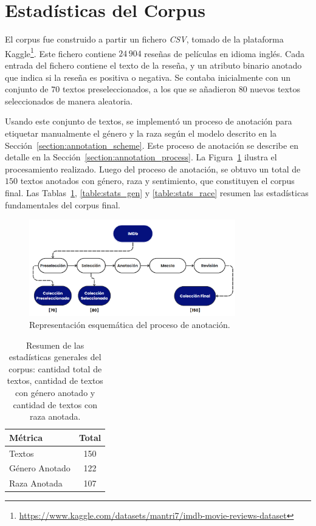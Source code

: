 \section{Estad\'isticas del Corpus}\label{section:corpus_stats}
El corpus fue construido a partir un fichero \emph{CSV}, tomado de la plataforma 
Kaggle\footnote{\url{https://www.kaggle.com/datasets/mantri7/imdb-movie-reviews-dataset}}. 
Este fichero contiene $24\,904$ rese\~nas de pel\'iculas en idioma ingl\'es. Cada entrada del fichero contiene el texto de la rese\~na, 
y un atributo binario anotado que indica si la rese\~na es positiva o negativa. Se contaba inicialmente con un conjunto de $70$ textos 
preseleccionados, a los que se a\~nadieron $80$ nuevos textos seleccionados de manera aleatoria.

Usando este conjunto de textos, se implement\'o un proceso de anotaci\'on para etiquetar manualmente el g\'enero y la raza seg\'un 
el modelo descrito en la Secci\'on~\ref{section:annotation_scheme}. Este proceso de anotaci\'on se describe en detalle en la 
Secci\'on~\ref{section:annotation_process}. La Figura~\ref{fig:ann_proc} ilustra el procesamiento realizado.
Luego del proceso de anotaci\'on, se obtuvo un total de $150$ textos anotados con g\'enero, raza y sentimiento, que constituyen el 
corpus final. Las Tablas~\ref{table:stats}, \ref{table:stats_gen} y \ref{table:stats_race}  resumen las estad\'isticas fundamentales 
del corpus final.

\begin{figure}[htpb]
    \begin{center}
        \includegraphics[width=0.8\textwidth]{Graphics/annotation_proc.png}
    \end{center}
    \caption{Representaci\'on esquem\'atica del proceso de anotaci\'on.}
    \label{fig:ann_proc}
\end{figure}

\begin{table}[htpb]
    \centering
        \begin{tabular}{lc}
        \toprule
        \textbf{M\'etrica} & \textbf{Total} \\
        \midrule
                    Textos & 150 \\
          G\'enero Anotado & 122 \\
              Raza Anotada & 107 \\

        \bottomrule
        \end{tabular}
    \caption{Resumen de las estad\'isticas generales del corpus: cantidad total de textos, cantidad de textos con g\'enero anotado y 
    cantidad de textos con raza anotada.}
    \label{table:stats}
\end{table}

